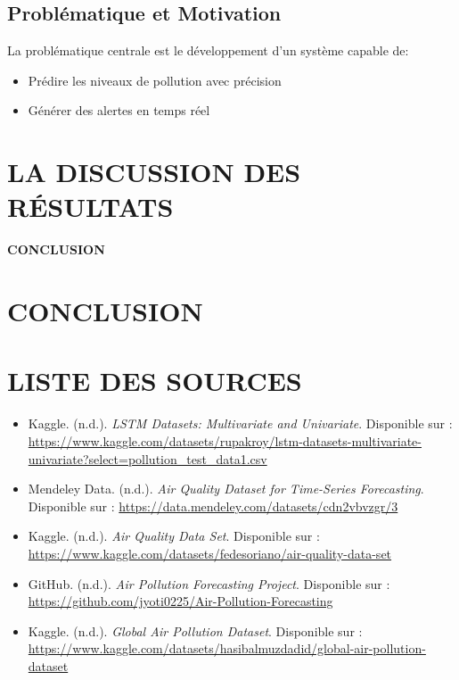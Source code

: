 \documentclass[12pt,a4paper]{report}
\begin{document}
\section{Problématique et Motivation}
La problématique centrale est le développement d'un système capable de:
\begin{itemize}
    \item Prédire les niveaux de pollution avec précision
    \item Générer des alertes en temps réel
\end{itemize}

\chapter{LA DISCUSSION DES RÉSULTATS}
\lipsum[3-4]

\newpage
\thispagestyle{empty}
\begin{center}
\vspace*{\fill}
{\Huge\textbf{CONCLUSION}}
\vspace*{\fill}
\end{center}

\chapter{CONCLUSION}
\lipsum[5-6]

\newpage
{}
{}
\chapter*{LISTE DES SOURCES}
\sloppy %
\begin{itemize}
    \item Kaggle. (n.d.). \textit{LSTM Datasets: Multivariate and Univariate}. Disponible sur : \url{https://www.kaggle.com/datasets/rupakroy/lstm-datasets-multivariate-univariate?select=pollution_test_data1.csv}
    \item Mendeley Data. (n.d.). \textit{Air Quality Dataset for Time-Series Forecasting}. Disponible sur : \url{https://data.mendeley.com/datasets/cdn2vbvzgr/3}
    \item Kaggle. (n.d.). \textit{Air Quality Data Set}. Disponible sur : \url{https://www.kaggle.com/datasets/fedesoriano/air-quality-data-set}
    \item GitHub. (n.d.). \textit{Air Pollution Forecasting Project}. Disponible sur : \url{https://github.com/jyoti0225/Air-Pollution-Forecasting}
    \item Kaggle. (n.d.). \textit{Global Air Pollution Dataset}. Disponible sur : \url{https://www.kaggle.com/datasets/hasibalmuzdadid/global-air-pollution-dataset}
\end{itemize}
\end{document}
